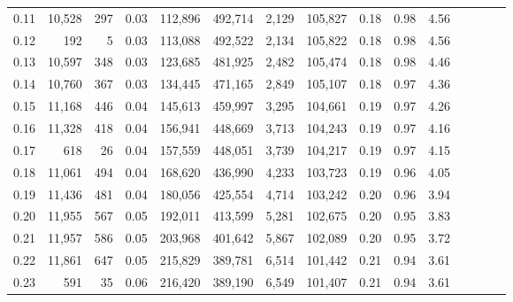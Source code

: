 \begin{tabular}{rrrcrrrrrrrrrrr}
0.11 &  10,528 &    297 &                                       0.03 &  112,896 &  492,714 &    2,129 &  105,827 &  0.18 &  0.98 &                         4.56 \\
0.12 &     192 &      5 &                                       0.03 &  113,088 &  492,522 &    2,134 &  105,822 &  0.18 &  0.98 &                         4.56 \\
0.13 &  10,597 &    348 &                                       0.03 &  123,685 &  481,925 &    2,482 &  105,474 &  0.18 &  0.98 &                         4.46 \\
0.14 &  10,760 &    367 &                                       0.03 &  134,445 &  471,165 &    2,849 &  105,107 &  0.18 &  0.97 &                         4.36 \\
0.15 &  11,168 &    446 &                                       0.04 &  145,613 &  459,997 &    3,295 &  104,661 &  0.19 &  0.97 &                         4.26 \\
0.16 &  11,328 &    418 &                                       0.04 &  156,941 &  448,669 &    3,713 &  104,243 &  0.19 &  0.97 &                         4.16 \\
0.17 &     618 &     26 &                                       0.04 &  157,559 &  448,051 &    3,739 &  104,217 &  0.19 &  0.97 &                         4.15 \\
0.18 &  11,061 &    494 &                                       0.04 &  168,620 &  436,990 &    4,233 &  103,723 &  0.19 &  0.96 &                         4.05 \\
0.19 &  11,436 &    481 &                                       0.04 &  180,056 &  425,554 &    4,714 &  103,242 &  0.20 &  0.96 &                         3.94 \\
0.20 &  11,955 &    567 &                                       0.05 &  192,011 &  413,599 &    5,281 &  102,675 &  0.20 &  0.95 &                         3.83 \\
0.21 &  11,957 &    586 &                                       0.05 &  203,968 &  401,642 &    5,867 &  102,089 &  0.20 &  0.95 &                         3.72 \\
0.22 &  11,861 &    647 &                                       0.05 &  215,829 &  389,781 &    6,514 &  101,442 &  0.21 &  0.94 &                         3.61 \\
0.23 &     591 &     35 &                                       0.06 &  216,420 &  389,190 &    6,549 &  101,407 &  0.21 &  0.94 &                         3.61 \\

\end{tabular}
